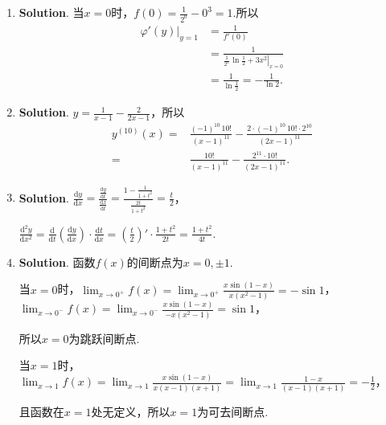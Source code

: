 \documentclass[../Main.tex]{subfiles}
\begin{document}
\begin{enumerate}
    \item \textbf{Solution}. 当$x=0$时，$f(0)=\frac{1}{2^{0}}-0^{3}=1$.所以
          \[
              \begin{aligned}
                  \left.\varphi'(y)\right|_{y=1} & =\frac{1}{f'(0)}                                                \\
                                                 & = \frac{1}{\left.\frac{1}{2^x}\ln\frac{1}{2}+3x^2\right|_{x=0}} \\
                                                 & = \frac{1}{\ln\frac{1}{2}}=-\frac{1}{\ln 2}.
              \end{aligned}
          \]

    \item \textbf{Solution}. $y=\frac{1}{x-1}-\frac{2}{2x-1}$，所以
          \[
              \begin{aligned}
                  y^{(10)}(x) = & \frac{(-1)^{10}\,10!}{(x-1)^{11}}-\frac{2\cdot(-1)^{10}\,10!\cdot 2^{10}}{(2x-1)^{11}} \\
                  =             & \frac{10!}{(x-1)^{11}}-\frac{2^{11}\cdot 10!}{(2x-1)^{11}}.
              \end{aligned}
          \]

    \item \textbf{Solution}. $\frac{\mathrm{d}y}{\mathrm{d}x}=\frac{\frac{\mathrm{d}y}{\mathrm{d}t}}{\frac{\mathrm{d}x}{\mathrm{d}t}}
              =\frac{1-\frac{1}{1+t^{2}}}{\frac{2t}{1+t^{2}}}=\frac{t}{2}$，

          $\frac{\mathrm{d}^{2}y}{\mathrm{d}x^{2}}=\frac{\mathrm{d}}{\mathrm{d}t}\left
              (\frac{\mathrm{d}y}{\mathrm{d}x}\right)\cdot\frac{\mathrm{d}t}{\mathrm{d}x}
              =\left(\frac{t}{2}\right)'\cdot\frac{1+t^{2}}{2t}=\frac{1+t^{2}}{4t}$.

    \item \textbf{Solution}. 函数$f(x)$的间断点为$x=0,\pm1$.

          当$x=0$时，$\lim_{x\to 0^+}f(x)=\lim_{x\to0^+}\frac{x\sin(1-x)}{x(x^{2}-1)}
              =-\sin 1$，$\lim_{x\to 0^-}f(x)=\lim_{x\to0^-}\frac{x\sin(1-x)}{-x(x^{2}-1)}
              =\sin 1$，

          所以$x=0$为跳跃间断点.

          当$x=1$时，$\lim_{x\to1}f(x)=\lim_{x\to1}\frac{x\sin(1-x)}{x(x-1)(x+1)}=\lim
              _{x\to1}\frac{1-x}{(x-1)(x+1)}=-\frac{1}{2}$，

          且函数在$x=1$处无定义，所以$x=1$为可去间断点.


\end{enumerate}
\end{document}
